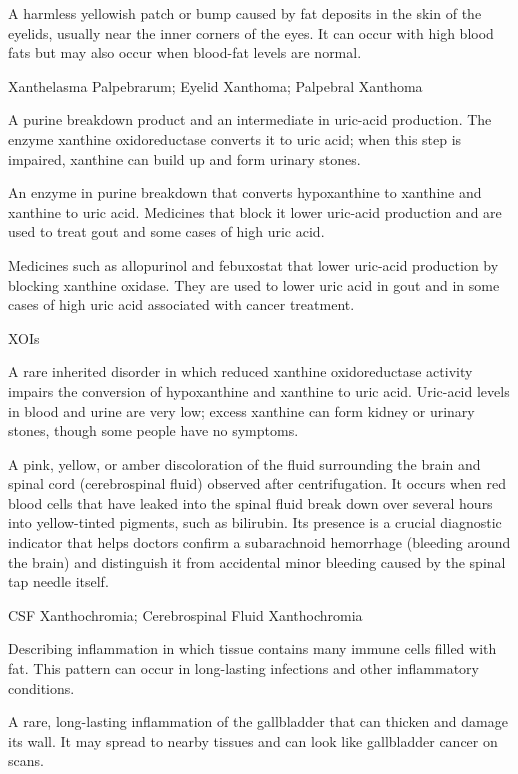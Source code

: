  A harmless yellowish patch or bump caused by fat deposits in the skin of the eyelids, usually near the inner corners of the eyes. It can occur with high blood fats but may also occur when blood-fat levels are normal.

\synonyms
Xanthelasma Palpebrarum; Eyelid Xanthoma; Palpebral Xanthoma

 A purine breakdown product and an intermediate in uric-acid production. The enzyme xanthine oxidoreductase converts it to uric acid; when this step is impaired, xanthine can build up and form urinary stones.

 An enzyme in purine breakdown that converts hypoxanthine to xanthine and xanthine to uric acid. Medicines that block it lower uric-acid production and are used to treat gout and some cases of high uric acid.

 Medicines such as allopurinol and febuxostat that lower uric-acid production by blocking xanthine oxidase. They are used to lower uric acid in gout and in some cases of high uric acid associated with cancer treatment.

\synonyms
XOIs

 A rare inherited disorder in which reduced xanthine oxidoreductase activity impairs the conversion of hypoxanthine and xanthine to uric acid. Uric-acid levels in blood and urine are very low; excess xanthine can form kidney or urinary stones, though some people have no symptoms.

 A pink, yellow, or amber discoloration of the fluid surrounding the brain and spinal cord (cerebrospinal fluid) observed after centrifugation. It occurs when red blood cells that have leaked into the spinal fluid break down over several hours into yellow-tinted pigments, such as bilirubin. Its presence is a crucial diagnostic indicator that helps doctors confirm a subarachnoid hemorrhage (bleeding around the brain) and distinguish it from accidental minor bleeding caused by the spinal tap needle itself.

\synonyms
CSF Xanthochromia; Cerebrospinal Fluid Xanthochromia

 Describing inflammation in which tissue contains many immune cells filled with fat. This pattern can occur in long-lasting infections and other inflammatory conditions.

 A rare, long-lasting inflammation of the gallbladder that can thicken and damage its wall. It may spread to nearby tissues and can look like gallbladder cancer on scans.

